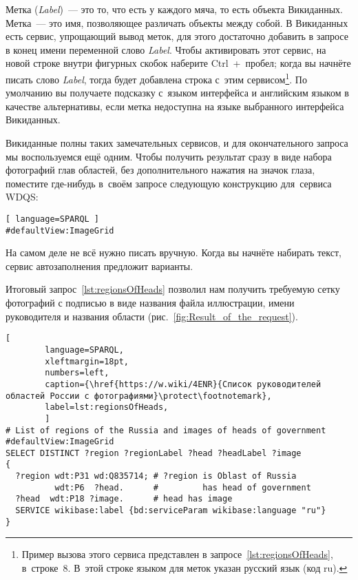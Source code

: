 Метка (\textit{Label})~--- это то, что есть у каждого мяча, то есть объекта Викиданных. 
Метка~--- это имя, позволяющее различать объекты между собой. 
В Викиданных есть сервис, упрощающий вывод меток, 
для этого достаточно добавить в запросе в конец имени переменной слово \textit{Label}.
Чтобы активировать этот сервис, на новой строке внутри фигурных скобок наберите Ctrl~+~пробел; 
когда вы начнёте писать слово \textit{Label}, тогда будет добавлена строка с~этим сервисом\footnote[][12pt]{%
%
Пример вызова этого сервиса представлен в запросе~\ref{lst:regionsOfHeads}, в~строке~8. 
В~этой строке языком для меток указан русский язык (код ru).}. По умолчанию 
вы получаете подсказку с~языком интерфейса 
и английским языком в качестве альтернативы, если метка недоступна на языке выбранного интерфейса Викиданных.


Викиданные полны таких замечательных сервисов, и для окончательного запроса мы воспользуемся ещё одним. 
Чтобы получить результат сразу в виде набора фотографий глав областей, 
без дополнительного нажатия на значок глаза, 
поместите где-нибудь в~своём запросе следующую конструкцию для~сервиса WDQS:
\begin{lstlisting}[ language=SPARQL ]
#defaultView:ImageGrid
\end{lstlisting}

На самом деле не всё нужно писать вручную. Когда вы начнёте набирать текст, сервис автозаполнения предложит варианты.


\newpage
Итоговый запрос~\ref{lst:regionsOfHeads} позволил нам получить требуемую сетку фотографий 
с подписью в виде названия файла иллюстрации, имени руководителя и названия области (рис.~\ref{fig:Result_of_the_request}).

\begin{lstlisting}[ 
        language=SPARQL, 
        xleftmargin=18pt, 
        numbers=left,
        caption={\href{https://w.wiki/4ENR}{Список руководителей областей России с фотографиями}\protect\footnotemark}, 
        label=lst:regionsOfHeads, 
        ]
# List of regions of the Russia and images of heads of government
#defaultView:ImageGrid
SELECT DISTINCT ?region ?regionLabel ?head ?headLabel ?image
{
  ?region wdt:P31 wd:Q835714; # ?region is Oblast of Russia
          wdt:P6  ?head.      #         has head of government
  ?head  wdt:P18 ?image.      # head has image
  SERVICE wikibase:label {bd:serviceParam wikibase:language "ru"} 
}
\end{lstlisting}

